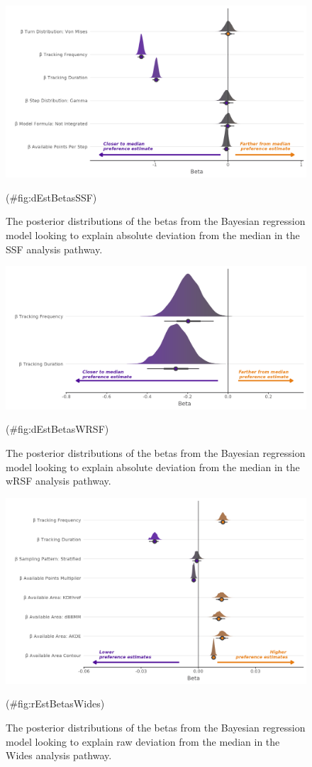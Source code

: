 \documentclass[10pt,a4paper]{article}
\begin{document}
\begin{figure}
\includegraphics[width=1\linewidth]{../figures/ssf_dEstSSF_effectsPlot} \caption{The posterior distributions of the betas from the Bayesian regression model looking to explain absolute deviation from the median in the SSF analysis pathway.}(\#fig:dEstBetasSSF)
\end{figure}

\begin{figure}
\includegraphics[width=1\linewidth]{../figures/wrsf_dEstwrsf_effectsPlot} \caption{The posterior distributions of the betas from the Bayesian regression model looking to explain absolute deviation from the median in the wRSF analysis pathway.}(\#fig:dEstBetasWRSF)
\end{figure}

\begin{figure}
\includegraphics[width=1\linewidth]{../figures/wides_rEstWides_effectsPlot} \caption{The posterior distributions of the betas from the Bayesian regression model looking to explain raw deviation from the median in the Wides analysis pathway.}(\#fig:rEstBetasWides)
\end{figure}
\end{document}
